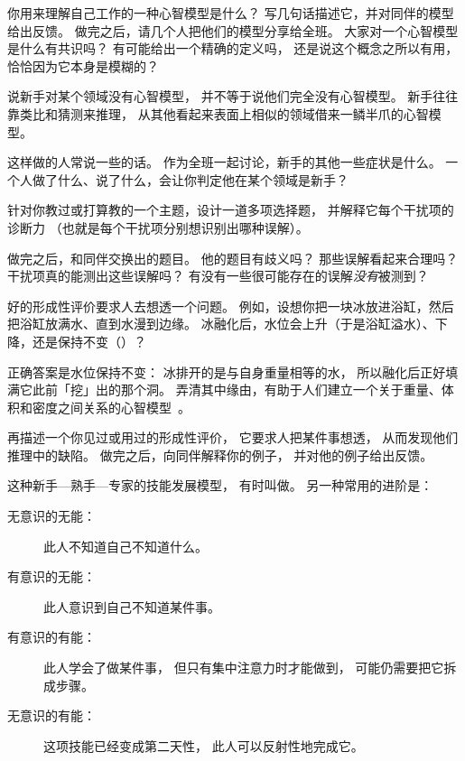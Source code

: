 你用来理解自己工作的一种心智模型是什么？
写几句话描述它，并对同伴的模型给出反馈。
做完之后，请几个人把他们的模型分享给全班。
大家对一个心智模型是什么有共识吗？
有可能给出一个精确的定义吗，
还是说这个概念之所以有用，恰恰因为它本身是模糊的？


说新手对某个领域没有心智模型，
并不等于说他们完全没有心智模型。
新手往往靠类比和猜测来推理，
从其他看起来表面上相似的领域借来一鳞半爪的心智模型。

这样做的人常说一些的话。
作为全班一起讨论，新手的其他一些症状是什么。
一个人做了什么、说了什么，会让你判定他在某个领域是新手？


针对你教过或打算教的一个主题，设计一道多项选择题，
并解释它每个干扰项的诊断力
（也就是每个干扰项分别想识别出哪种误解）。

做完之后，和同伴交换出的题目。
他的题目有歧义吗？
那些误解看起来合理吗？
干扰项真的能测出这些误解吗？
有没有一些很可能存在的误解\emph{没有}被测到？


好的形成性评价要求人去想透一个问题。
例如，设想你把一块冰放进浴缸，然后把浴缸放满水、直到水漫到边缘。
冰融化后，水位会上升（于是浴缸溢水）、下降，还是保持不变（）？


正确答案是水位保持不变：
冰排开的是与自身重量相等的水，
所以融化后正好填满它此前「挖」出的那个洞。
弄清其中缘由，有助于人们建立一个关于重量、体积和密度之间关系的心智模型~\cite{Epst2002}。

再描述一个你见过或用过的形成性评价，
它要求人把某件事想透，
从而发现他们推理中的缺陷。
做完之后，向同伴解释你的例子，
并对他的例子给出反馈。


这种新手—熟手—专家的技能发展模型，
有时叫做。
另一种常用的进阶是：

\begin{description}

\item[无意识的无能：]
  此人不知道自己不知道什么。

\item[有意识的无能：]
  此人意识到自己不知道某件事。

\item[有意识的有能：]
  此人学会了做某件事，
  但只有集中注意力时才能做到，
  可能仍需要把它拆成步骤。

\item[无意识的有能：]
  这项技能已经变成第二天性，
  此人可以反射性地完成它。

\end{description}

